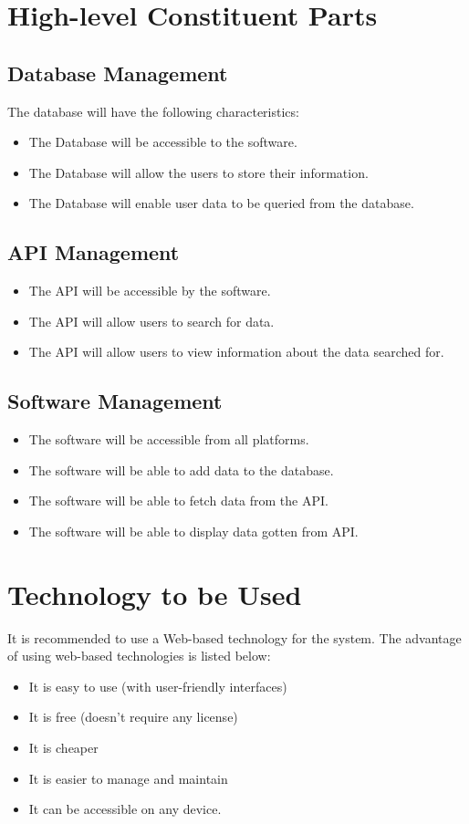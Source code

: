\documentclass[twoside, a4paper, 12pt]{report}
\begin{document}
\section{High-level Constituent Parts}
\subsection{Database Management}
The database will have the following characteristics:
\begin{itemize}
	\item The Database will be accessible to the software.
	\item The Database will allow the users to store their information.
	\item The Database will enable user data to be queried from the database.
\end{itemize}

\subsection{API Management}
\begin{itemize}
	\item The API will be accessible by the software.
	\item The API will allow users to search for data.
	\item The API will allow users to view information about the data searched for.
\end{itemize}

\subsection{Software Management}
\begin{itemize}
	\item The software will be accessible from all platforms.
	\item The software will be able to add data to the database.
	\item The software will be able to fetch data from the API.
	\item The software will be able to display data gotten from API.
\end{itemize}

\section{Technology to be Used}
It is recommended to use a Web-based technology for the system. The advantage of using web-based technologies is listed below:
\begin{itemize}
	\item It is easy to use (with user-friendly interfaces)
	\item It is free (doesn't require any license)
	\item It is cheaper
	\item It is easier to manage and maintain
	\item It can be accessible on any device.
\end{itemize}
\end{document}
